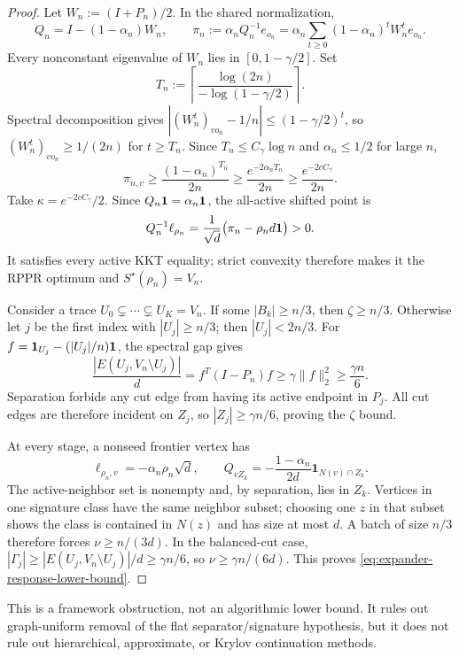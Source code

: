 \begin{proof}
Let $W_n:=(I+P_n)/2$.  In the shared normalization,
\begin{equation}
 Q_n=I-(1-\alpha_n)W_n,
 \qquad
 \pi_n:=\alpha_nQ_n^{-1}e_{o_n}
 =\alpha_n\sum_{t\geq0}(1-\alpha_n)^tW_n^te_{o_n}.
 \label{eq:expander-pagerank-series}
\end{equation}
Every nonconstant eigenvalue of $W_n$ lies in $[0,1-\gamma/2]$.  Set
\begin{equation}
 T_n:=\left\lceil
 \frac{\log(2n)}{-\log(1-\gamma/2)}
 \right\rceil.
 \label{eq:expander-mixing-time}
\end{equation}
Spectral decomposition gives
$|(W_n^t)_{vo_n}-1/n|\leq(1-\gamma/2)^t$, so
$(W_n^t)_{vo_n}\geq1/(2n)$ for $t\geq T_n$.  Since
$T_n\leq C_\gamma\log n$ and $\alpha_n\leq1/2$ for large $n$,
\begin{equation}
 \pi_{n,v}
 \geq\frac{(1-\alpha_n)^{T_n}}{2n}
 \geq\frac{e^{-2\alpha_nT_n}}{2n}
 \geq\frac{e^{-2cC_\gamma}}{2n}.
 \label{eq:expander-pagerank-floor}
\end{equation}
Take $\kappa=e^{-2cC_\gamma}/2$.  Since $Q_n\mathbf{1}=\alpha_n\mathbf{1}$, the
all-active shifted point is
\begin{equation}
 Q_n^{-1}\ell_{\rho_n}
 =\frac1{\sqrt d}\bigl(\pi_n-\rho_nd\mathbf{1}\bigr)>0.
 \label{eq:expander-full-support}
\end{equation}
It satisfies every active KKT equality; strict convexity therefore makes it
the RPPR optimum and $S^\star(\rho_n)=V_n$.

Consider a trace $U_0\subsetneq\cdots\subsetneq U_K=V_n$.  If some
$|B_k|\geq n/3$, then $\zeta\geq n/3$.  Otherwise let $j$ be the first index
with $|U_j|\geq n/3$; then $|U_j|<2n/3$.  For
$f=\mathbf1_{U_j}-(|U_j|/n)\mathbf{1}$, the spectral gap gives
\begin{equation}
 \frac{|E(U_j,V_n\setminus U_j)|}{d}
 =f^T(I-P_n)f
 \geq\gamma\|f\|_2^2
 \geq\frac{\gamma n}{6}.
 \label{eq:expander-cut}
\end{equation}
Separation forbids any cut edge from having its active endpoint in $P_j$.
All cut edges are therefore incident on $Z_j$, so
$|Z_j|\geq\gamma n/6$, proving the $\zeta$ bound.

At every stage, a nonseed frontier vertex has
\begin{equation}
 \ell_{\rho_n,v}=-\alpha_n\rho_n\sqrt d,
 \qquad
 Q_{vZ_k}=-\frac{1-\alpha_n}{2d}
          \mathbf1_{N(v)\cap Z_k}.
 \label{eq:expander-signature}
\end{equation}
The active-neighbor set is nonempty and, by separation, lies in $Z_k$.
Vertices in one signature class have the same neighbor subset; choosing one
$z$ in that subset shows the class is contained in $N(z)$ and has size at
most $d$.  A batch of size $n/3$ therefore forces
$\nu\geq n/(3d)$.  In the balanced-cut case,
$|\Gamma_j|\geq|E(U_j,V_n\setminus U_j)|/d\geq\gamma n/6$, so
$\nu\geq\gamma n/(6d)$.  This proves
\cref{eq:expander-response-lower-bound}.
\end{proof}

This is a framework obstruction, not an algorithmic lower bound.  It rules
out graph-uniform removal of the flat separator/signature hypothesis, but it
does not rule out hierarchical, approximate, or Krylov continuation methods.
